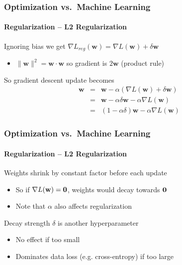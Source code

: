 \documentclass[xetex,professionalfont]{beamer}
\newcommand{\eg}{\mbox{e.g.}\xspace} %
\renewcommand{\vec}[1]{\ensuremath{\mathbf{#1}}}
\newcommand{\vw}{\vec{w}}
\begin{document}
\begin{frame}
	\frametitle{Optimization vs.~Machine Learning}
	\framesubtitle{Regularization -- L2 Regularization}

	Ignoring bias we get $\nabla L_{reg}(\vw)=\nabla L(\vw)+\delta\vw$
	\begin{itemize}
		\item $\lVert\vw\rVert^2=\vw\cdot\vw$ so gradient is $2\vw$ (product rule)
	\end{itemize}

	\bigskip

	So gradient descent update becomes
	\begin{eqnarray*}
		\vw&=&\vw-\alpha(\nabla L(\vw)+\delta\vw)\\
		&=&\vw-\alpha\delta\vw-\alpha\nabla L(\vw)\\
		&=&(1-\alpha\delta)\vw-\alpha\nabla L(\vw)
	\end{eqnarray*}

\end{frame}


\begin{frame}
	\frametitle{Optimization vs.~Machine Learning}
	\framesubtitle{Regularization -- L2 Regularization}

	Weights shrink by constant factor before each update
	\begin{itemize}
		\item So if $\nabla L(\vw)=\bf{0}$, weights would decay towards $\bf{0}$
		\item Note that $\alpha$ also affects regularization %
	\end{itemize}

	\bigskip

	Decay strength $\delta$ is another hyperparameter
	\begin{itemize}
		\item No effect if too small
		\item Dominates data loss (\eg cross-entropy) if too large
	\end{itemize}

\end{frame}
\end{document}
